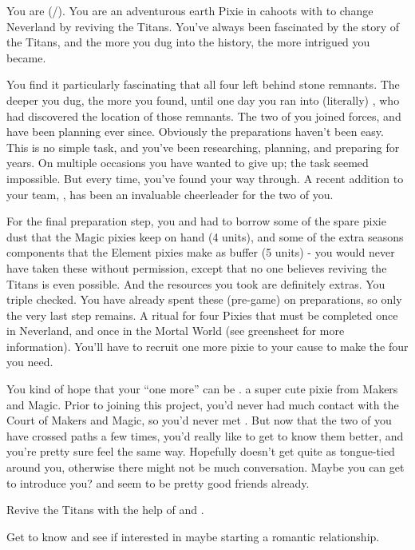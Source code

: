 \documentclass[char]{PP}
\begin{document}
\name{\cETitan{}}

You are \cETitan{} (\cETitan{\They}/\cETitan{\Them}). You are an adventurous earth Pixie in cahoots with \cFTitan{} to change Neverland by reviving the Titans. You’ve always been fascinated by the story of the Titans, and the more you dug into the history, the more intrigued you became. 

You find it particularly fascinating that all four left behind stone remnants. The deeper you dug, the more you found, until one day you ran into (literally) \cFTitan{}, who had discovered the location of those remnants. The two of you joined forces, and have been planning ever since. Obviously the preparations haven’t been easy. This is no simple task, and you’ve been researching, planning, and preparing for years. On multiple occasions you have wanted to give up; the task seemed impossible. But every time, you’ve found your way through. A recent addition to your team, \cEAirship{}, has been an invaluable cheerleader for the two of you.

For the final preparation step, you and \cETitan{} had to borrow some of the spare pixie dust that the Magic pixies keep on hand (4 units), and some of the extra seasons components that the Element pixies make as buffer (5 units) - you would never have taken these without permission, except that no one believes reviving the Titans is even possible. And the resources you took are definitely extras. You triple checked. You have already spent these (pre-game) on preparations, so only the very last step remains. A ritual for four Pixies that must be completed once in Neverland, and once in the Mortal World (see greensheet for more information). You’ll have to recruit one more pixie to your cause to make the four you need.

You kind of hope that your “one more” can be \cMAirship{}. \cMAirship{\Theyare} a super cute pixie from Makers and Magic. Prior to \cEAirship{} joining this project, you’d never had much contact with the Court of Makers and Magic, so you’d never met \cMAirship{}. But now that the two of you have crossed paths a few times, you’d really like to get to know them better, and you’re pretty sure \cMAirship{\they} feel\cMAirship{\plural} the same way. Hopefully \cMAirship{} doesn’t get quite as tongue-tied around you, otherwise there might not be much conversation. Maybe you can get \cEAirship{} to introduce you? \cEAirship{} and \cMAirship{} seem to be pretty good friends already.
 

\begin{itemz}
	\item Revive the Titans with the help of \cFTitan{} and \cEAirship{}.
	\item Get to know \cMAirship{} and see if \cMAirship{\they} \cMAirship{\are} interested in maybe starting a romantic relationship.
\end{itemz}
\end{document}
